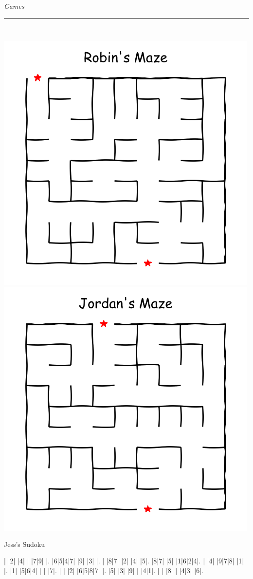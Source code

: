 \documentclass{article}
\renewcommand\headline[1]{\begin{center} {\huge \textsl{ #1}}\\ %
			\rule[5pt]{0.8\hsize}{0.5pt}\\ \end{center}}
\begin{document}
\begin{multicols}{3}
\headline{Games}
\vspace{-0.5cm}
\center\includegraphics[width=\linewidth]{images/maze_r.png}
\vspace{-0.9cm}
\center\includegraphics[width=\linewidth]{images/maze_j.png}
\vspace{-0.6cm}

\renewcommand*\sudokuformat[1]{\sffamily#1}
\setlength\sudokusize{4.7cm}
\setlength\sudokuthickline{1pt}
Jess's Sudoku\vspace{0.2cm}
\begin{sudoku-block}
| |2| |4| | |7|9| |.
|6|5|4|7| |9| |3| |.
| |8|7| |2| |4| |5|.
|8|7| |5| |1|6|2|4|.
| |4| |9|7|8| |1| |.
|1| |5|6|4| | | |7|.
| | |2| |6|5|8|7| |.
|5| |3| |9| | |4|1|.
| | |8| | |4|3| |6|.
\end{sudoku-block}

\end{multicols}
\end{document}
